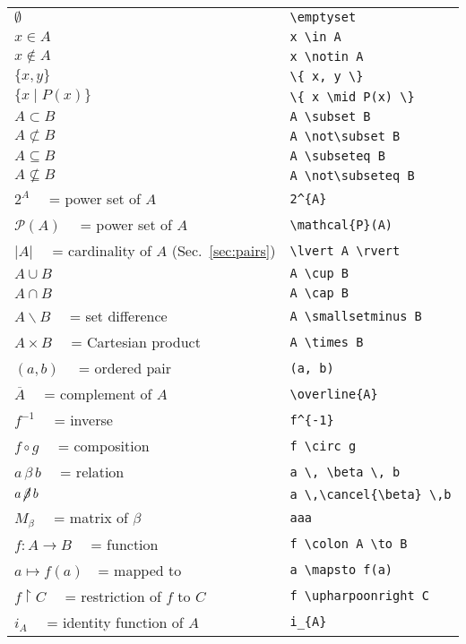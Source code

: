 \documentclass[a4paper,10pt,landscape]{article}
\theoremstyle{definition}
\theoremstyle{remark}
\newcommand{\refsec}[1]{Sec.~\ref{#1}}
\begin{document}
\begin{multicols}{3}
\begin{tabular}{@{}ll@{}}
	$\emptyset$	&\verb!\emptyset!\\
	$x \in A$	&\verb!x \in A!\\
	$x \notin A$	&\verb!x \notin A!\\
	$\{ x, y \}$	& \verb!\{ x, y \}!\\
	$\{ x \mid P(x) \}$	&\verb!\{ x \mid P(x) \}!\\
	$A \subset B$	&\verb!A \subset B!\\
	$A \not\subset B$	&\verb!A \not\subset B!\\
	$A \subseteq B$	&\verb!A \subseteq B!\\
	$A \not\subseteq B$	&\verb!A \not\subseteq B!\\
	$2^{A}$ 	~~= power set of $A$	&\verb!2^{A}!\\
	$\mathcal{P}(A)$ 	~~= power set of $A$	&\verb!\mathcal{P}(A)!\\
	$\lvert A \rvert$  	~~= cardinality of $A$ (\refsec{sec:pairs})	&\verb!\lvert A \rvert!\\
	$A \cup B$	&\verb!A \cup B!\\
	$A \cap B$	&\verb!A \cap B!\\
	$A \smallsetminus B$	~~= set difference	&\verb!A \smallsetminus B!\\
	$A \times B$  	~~= Cartesian product	&\verb!A \times B!\\
	$(a, b)$ 	~~= ordered pair	&\verb!(a, b)!\\
%	
	$\overline{A}$	~~= complement of $A$	&\verb!\overline{A}!\\
	$f^{-1}$	~~= inverse	&\verb!f^{-1}!\\
	$f \circ g$	~~= composition	&\verb!f \circ g!\\
	$a \, \beta \, b$ 	~~= relation	&\verb!a \, \beta \, b!\\
	$a \, \cancel{\beta} \, b$	&\verb!a \,\cancel{\beta} \,b!\\
	$M_{\beta}$ 	~~= matrix of $\beta$	&\verb!aaa!\\
	$f \colon A \to B$	~~= function	&\verb!f \colon A \to B!\\
	$a \mapsto f(a)$~~= mapped to	&\verb!a \mapsto f(a)!\\
	$f \upharpoonright C$	~~= restriction of $f$ to $C$	
		&\verb!f \upharpoonright C!\\
	$i_{A}$	~~= identity function of $A$	&\verb!i_{A}!\\

\end{tabular}
\end{multicols}
\end{document}
